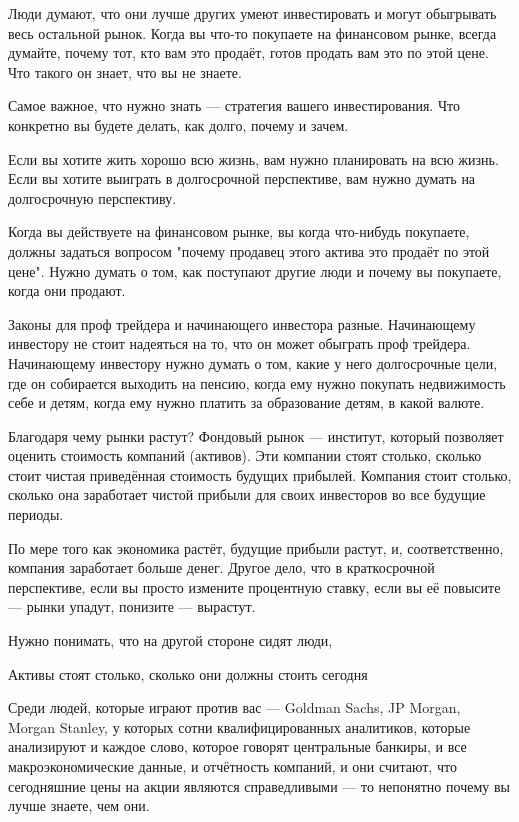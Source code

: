 \documentclass[11pt]{article}
\theoremstyle{remark}
\theoremstyle{definition}
\begin{document}
\begin{enumerate}
Люди думают, что они лучше других умеют инвестировать и могут обыгрывать весь остальной рынок. Когда вы что-то покупаете на финансовом рынке, всегда думайте, почему тот, кто вам это продаёт, готов продать вам это по этой цене. Что такого он знает, что вы не знаете.

Самое важное, что нужно знать --- стратегия вашего инвестирования. Что конкретно вы будете делать, как долго, почему и зачем. 

Если вы хотите жить хорошо всю жизнь, вам нужно планировать на всю жизнь. Если вы хотите выиграть в долгосрочной перспективе, вам нужно думать на долгосрочную перспективу.

Когда вы действуете на финансовом рынке, вы когда что-нибудь покупаете, должны задаться вопросом "почему продавец этого актива это продаёт по этой цене". Нужно думать о том, как поступают другие люди и почему вы покупаете, когда они продают. 

Законы для проф трейдера и начинающего инвестора разные. Начинающему инвестору не стоит надеяться на то, что он может обыграть проф трейдера. Начинающему инвестору нужно думать о том, какие у него долгосрочные цели, где он собирается выходить на пенсию, когда ему нужно покупать недвижимость себе и детям, когда ему нужно платить за образование детям, в какой валюте.

Благодаря чему рынки растут? Фондовый рынок --- институт, который позволяет оценить стоимость компаний (активов). Эти компании стоят столько, сколько стоит чистая приведённая стоимость будущих прибылей. Компания стоит столько, сколько она заработает чистой прибыли для своих инвесторов во все будущие периоды.

По мере того как экономика растёт, будущие прибыли растут, и, соответственно, компания заработает больше денег. Другое дело, что в краткосрочной перспективе, если вы просто измените процентную ставку, если вы её повысите --- рынки упадут, понизите --- вырастут. 

Нужно понимать, что на другой стороне сидят люди, 

Активы стоят столько, сколько они должны стоить сегодня

Среди людей, которые играют против вас --- Goldman Sachs, JP Morgan, Morgan Stanley, у которых сотни квалифицированных аналитиков, которые анализируют и каждое слово, которое говорят центральные банкиры, и все макроэкономические данные, и отчётность компаний, и они считают, что сегодняшние цены на акции являются справедливыми --- то непонятно почему вы лучше знаете, чем они.


\end{enumerate}
\end{document}
